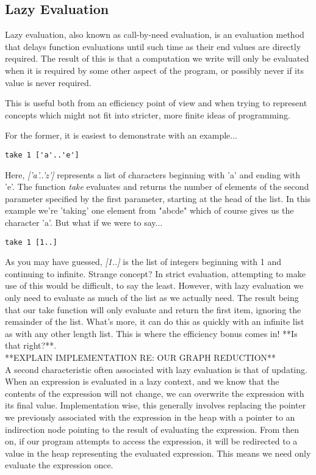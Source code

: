 \documentclass[11pt]{article}
\begin{document}
\subsection{Lazy Evaluation}
Lazy evaluation, also known as call-by-need evaluation, is an evaluation method
that delays function evaluations until such time as their end values are directly
required. The result of this is that a computation we write will only be 
evaluated when it is required by some other aspect of the program, or possibly never
if its value is never required. 

This is useful both from an efficiency point of view and when trying to 
represent concepts which might not fit into stricter, more finite ideas of
programming. 

For the former, it is easiest to demonstrate with an example...
\begin{verbatim}
take 1 ['a'..'e']
\end{verbatim}
Here, \emph{['a'..'z']} represents a list of characters beginning with 'a' and 
ending with 'e'. The function \emph{take} evaluates and returns the number of
elements of the second parameter specified by the first parameter, starting at the
head of the list. In this example we're 'taking' one element from "abcde" which
of course gives us the character 'a'. But what if we were to say...
\begin{verbatim}
take 1 [1..]
\end{verbatim}
As you may have guessed, \emph{[1..]} is the list of integers beginning with 1
and continuing to infinite. Strange concept? In strict evaluation, attempting
to make use of this would be difficult, to say the least. However, with lazy 
evaluation we only need to evaluate as much of the list as we actually need.
The result being that our take function will only evaluate and return the 
first item, ignoring the remainder of the list. What's more, it can do this
as quickly with an infinite list as with any other length list. This is where the
efficiency bonus comes in! **Is that right?**. \\


**EXPLAIN IMPLEMENTATION RE: OUR GRAPH REDUCTION**  \\


A second characteristic often associated with lazy evaluation is that of 
updating. When an expression is evaluated in a lazy context, and we know
that the contents of the expression will not change, we can overwrite the
expression with its final value. Implementation wise, this generally involves
replacing the pointer we previously associated with the expression in the
heap with a pointer to an indirection node pointing to the result of 
evaluating the expression. From then on, if our program attempts to 
access the expression, it will be redirected to a value in the heap 
representing the evaluated expression. This means we need only evaluate
the expression once. 
\end{document}
